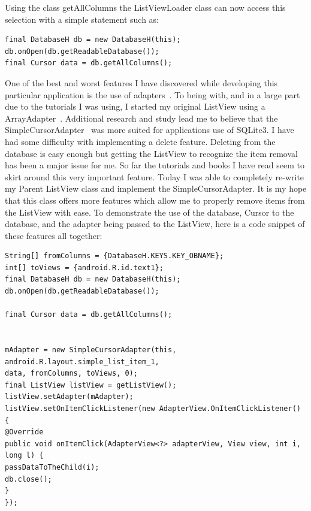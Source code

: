\documentclass[fontsize=11pt, %
paper=a4, %
twoside, %
captions=tableheading,
index=totoc,
hyperref]{labbook}
\begin{document}
\clearpage
\begin{onehalfspace}
Using the class getAllColumns the ListViewLoader class can now access this selection with a simple statement such as:
\end{onehalfspace}
\begin{verbatim}
final DatabaseH db = new DatabaseH(this);
db.onOpen(db.getReadableDatabase());
final Cursor data = db.getAllColumns();
\end{verbatim}


\begin{onehalfspace}
One of the best and worst features I have discovered while developing this particular application is the use of adapters~\citep{Adapter}. To being with, and in a large part due to the tutorials I was using, I started my original ListView using a ArrayAdapter~\citep{ArrayAdapter}. Additional research and study lead me to believe that the SimpleCursorAdapter~\citep{SimpleCursorAdapter} was more suited for applications use of SQLite3. I have had some difficulty with implementing a delete feature. Deleting from the database is easy enough but getting the ListView to recognize the item removal has been a major issue for me. So far the tutorials and books I have read seem to skirt around this very important feature. Today I was able to completely re-write my Parent ListView class and implement the SimpleCursorAdapter. It is my hope that this class offers more features which allow me to properly remove items from the ListView with ease. To demonstrate the use of the database, Cursor to the database, and the adapter being passed to the ListView, here is a code snippet of these features all together: 
\end{onehalfspace}
\begin{verbatim}
String[] fromColumns = {DatabaseH.KEYS.KEY_OBNAME};
int[] toViews = {android.R.id.text1};
final DatabaseH db = new DatabaseH(this);
db.onOpen(db.getReadableDatabase());

final Cursor data = db.getAllColumns();


mAdapter = new SimpleCursorAdapter(this, android.R.layout.simple_list_item_1,
data, fromColumns, toViews, 0);
final ListView listView = getListView();
listView.setAdapter(mAdapter);
listView.setOnItemClickListener(new AdapterView.OnItemClickListener() {
@Override
public void onItemClick(AdapterView<?> adapterView, View view, int i, long l) {
passDataToTheChild(i);
db.close();
}
});
\end{verbatim}
\end{document}
